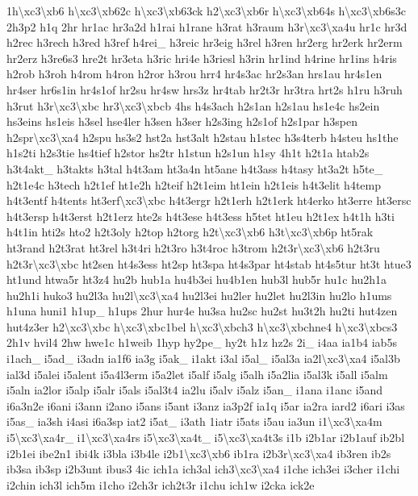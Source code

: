 {1h\textbackslash{}xc3\textbackslash{}xb6 h\textbackslash{}xc3\textbackslash{}xb62c h\textbackslash{}xc3\textbackslash{}xb63ck h2\textbackslash{}xc3\textbackslash{}xb6r h\textbackslash{}xc3\textbackslash{}xb64s h\textbackslash{}xc3\textbackslash{}xb6s3c 2h3p2 h1q 2hr hr1ac hr3a2d h1rai h1rane h3rat h3raum h3r\textbackslash{}xc3\textbackslash{}xa4u hr1c hr3d h2rec h3rech h3red h3ref h4rei\-\_\- h3reic hr3eig h3rel h3ren hr2erg hr2erk hr2erm hr2erz h3re6s3 hre2t hr3eta h3ric hri4e h3riesl h3rin hr1ind h4rine hr1ins h4ris h2rob h3roh h4rom h4ron h2ror h3rou hrr4 hr4s3ac hr2s3an hrs1au hr4s1en hr4ser hr6s1in hr4s1of hr2su hr4sw hrs3z hr4tab hr2t3r hr3tra hrt2s h1ru h3ruh h3rut h3r\textbackslash{}xc3\textbackslash{}xbc hr3\textbackslash{}xc3\textbackslash{}xbcb 4hs h4s3ach h2s1an h2s1au hs1e4c hs2ein hs3eins hs1eis h3sel hse4ler h3sen h3ser h2s3ing h2s1of h2s1par h3spen h2spr\textbackslash{}xc3\textbackslash{}xa4 h2spu hs3s2 hst2a hst3alt h2stau h1stec h3s4terb h4steu hs1the h1s2ti h2s3tie hs4tief h2stor hs2tr h1stun h2s1un h1sy 4h1t h2t1a htab2s h3t4akt\-\_\- h3takts h3tal h4t3am ht3a4n ht5ane h4t3ass h4tasy ht3a2t h5te\-\_\- h2t1e4c h3tech h2t1ef ht1e2h h2teif h2t1eim ht1ein h2t1eis h4t3elit h4temp h4t3entf h4tents ht3erf\textbackslash{}xc3\textbackslash{}xbc h4t3ergr h2t1erh h2t1erk ht4erko ht3erre ht3ersc h4t3ersp h4t3erst h2t1erz hte2s h4t3ese h4t3ess h5tet ht1eu h2t1ex h4t1h h3ti h4t1in hti2s hto2 h2t3oly h2top h2torg h2t\textbackslash{}xc3\textbackslash{}xb6 h3t\textbackslash{}xc3\textbackslash{}xb6p ht5rak ht3rand h2t3rat ht3rel h3t4ri h2t3ro h3t4roc h3trom h2t3r\textbackslash{}xc3\textbackslash{}xb6 h2t3ru h2t3r\textbackslash{}xc3\textbackslash{}xbc ht2sen ht4s3ess ht2sp ht3spa ht4s3par ht4stab ht4s5tur ht3t htue3 ht1und htwa5r ht3z4 hu2b hub1a hu4b3ei hu4b1en hub3l hub5r hu1c hu2h1a hu2h1i huko3 hu2l3a hu2l\textbackslash{}xc3\textbackslash{}xa4 hu2l3ei hu2ler hu2let hu2l3in hu2lo h1ums h1una huni1 h1up\-\_\- h1ups 2hur hur4e hu3sa hu2sc hu2st hu3t2h hu2ti hut4zen hut4z3er h2\textbackslash{}xc3\textbackslash{}xbc h\textbackslash{}xc3\textbackslash{}xbc1bel h\textbackslash{}xc3\textbackslash{}xbch3 h\textbackslash{}xc3\textbackslash{}xbchne4 h\textbackslash{}xc3\textbackslash{}xbcs3 2h1v hvil4 2hw hwe1c h1weib 1hyp hy2pe\-\_\- hy2t h1z hz2s 2i\-\_\- i4aa ia1b4 iab5s i1ach\-\_\- i5ad\-\_\- i3adn ia1f6 ia3g i5ak\-\_\- i1akt i3al i5al\-\_\- i5al3a ia2l\textbackslash{}xc3\textbackslash{}xa4 i5al3b ial3d i5alei i5alent i5a4l3erm i5a2let i5alf i5alg i5alh i5a2lia i5al3k i5all i5alm i5aln ia2lor i5alp i5alr i5als i5al3t4 ia2lu i5alv i5alz i5an\-\_\- i1ana i1anc i5and i6a3n2e i6ani i3ann i2ano i5ans i5ant i3anz ia3p2f ia1q i5ar ia2ra iard2 i6ari i3as i5as\-\_\- ia3sh i4asi i6a3sp iat2 i5at\-\_\- i3ath 1iatr i5ats i5au ia3un i1\textbackslash{}xc3\textbackslash{}xa4m i5\textbackslash{}xc3\textbackslash{}xa4r\-\_\- i1\textbackslash{}xc3\textbackslash{}xa4rs i5\textbackslash{}xc3\textbackslash{}xa4t\-\_\- i5\textbackslash{}xc3\textbackslash{}xa4t3s i1b i2b1ar i2b1auf ib2bl i2b1ei ibe2n1 ibi4k i3bla i3b4le i2b1\textbackslash{}xc3\textbackslash{}xb6 ib1ra i2b3r\textbackslash{}xc3\textbackslash{}xa4 ib3ren ib2s ib3sa ib3sp i2b3unt ibus3 4ic ich1a ich3al ich3\textbackslash{}xc3\textbackslash{}xa4 i1che ich3ei i3cher i1chi i2chin ich3l ich5m i1cho i2ch3r ich2t3r i1chu ich1w i2cka ick2e }
